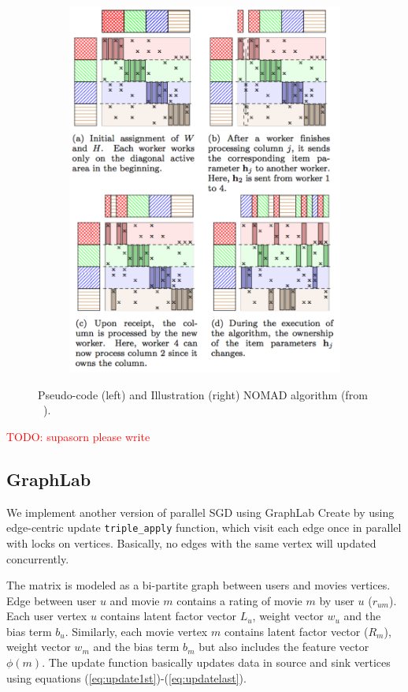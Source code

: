 \documentclass{article} %
\newcommand{\todo}[1]{\textcolor{red}{TODO: #1}}
\begin{document}
\begin{figure}[hb]
\begin{subfigure}[b]{0.5\textwidth}
    \includegraphics[width=\textwidth]{figures/nomad}
    \label{fig:nomad}
  \end{subfigure}
  \vspace{-20pt}
  \caption{Pseudo-code (left) and Illustration (right) NOMAD algorithm (from ~\cite{yun2013nomad}).}
\end{figure}

\todo{supasorn please write}

\subsection{GraphLab}

We implement another version of parallel SGD using
GraphLab Create by using edge-centric update \texttt{triple\_apply} function, which visit each edge once in parallel with locks on vertices.
Basically, no edges with the same vertex will updated concurrently.

The matrix is modeled as a bi-partite graph between users and movies vertices.
Edge between user $u$ and movie $m$ contains a rating of movie $m$ by user $u$
($r_{um}$). Each user vertex $u$ contains latent factor vector $L_u$, weight
vector $w_u$ and the bias term $b_u$. Similarly, each movie vertex $m$
contains latent factor vector ($R_m$), weight vector $w_m$ and the bias term
$b_m$ but also includes the feature vector $\phi(m)$.  The update function
 basically updates data in source and sink vertices using equations (\ref{eq:update1st})-(\ref{eq:updatelast}).
\end{document}
